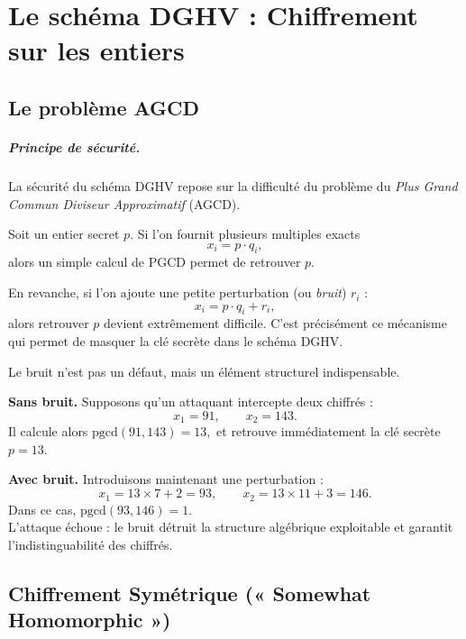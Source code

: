 \chapter{Le schéma DGHV : Chiffrement sur les entiers}

\section{Le problème AGCD}

\paragraph{Principe de sécurité.}
La sécurité du schéma DGHV repose sur la difficulté du problème du \emph{Plus Grand Commun Diviseur Approximatif} (AGCD).

\begin{problem}[AGCD]
Soit un entier secret $p$. Si l’on fournit plusieurs multiples exacts
\[
    x_i = p \cdot q_i,
\]
alors un simple calcul de PGCD permet de retrouver $p$.

En revanche, si l’on ajoute une petite perturbation (ou \emph{bruit}) $r_i$ :
\[
    x_i = p \cdot q_i + r_i,
\]
alors retrouver $p$ devient extrêmement difficile.  
C’est précisément ce mécanisme qui permet de masquer la clé secrète dans le schéma DGHV.
\end{problem}

\begin{example}
Le bruit n’est pas un défaut, mais un élément structurel indispensable.

\medskip

\noindent\textbf{Sans bruit.}  
Supposons qu’un attaquant intercepte deux chiffrés :
\[
    x_1 = 91, \qquad x_2 = 143.
\]
Il calcule alors
    $\mathrm{pgcd}(91, 143) = 13,$
et retrouve immédiatement la clé secrète $p = 13$.

\medskip

\noindent\textbf{Avec bruit.}  
Introduisons maintenant une perturbation :
\[
    x_1 = 13 \times 7 + 2 = 93, 
    \qquad
    x_2 = 13 \times 11 + 3 = 146.
\]
Dans ce cas,
    $\mathrm{pgcd}(93, 146) = 1.$
\\L’attaque échoue : le bruit détruit la structure algébrique exploitable et garantit l’indistinguabilité des chiffrés.
\end{example}

\section{Chiffrement Symétrique (« Somewhat Homomorphic »)}

